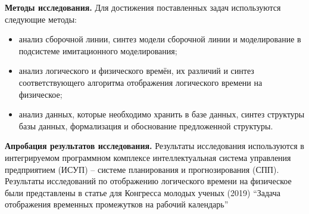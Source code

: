 \indent \textbf{Методы исследования.}
Для достижения поставленных задач используются следующие методы:
\begin{itemize}
	\item анализ сборочной линии, синтез модели сборочной линии и моделирование в подсистеме имитационного моделирования;
	\item анализ логического и физического времён, их различий и синтез соответствующего алгоритма отображения логического времени на физическое;
	\item анализ данных, которые необходимо хранить в базе данных, синтез структуры базы данных, формализация и обоснование предложенной структуры.
\end{itemize}
\indent \textbf{Апробация результатов исследования.}
Результаты исследования используются в интегрируемом программном комплексе интеллектуальная система управления предприятием (ИСУП) – системе планирования и прогнозирования (СПП). 
Результаты исследований по отображению логического времени на физическое были представлены в статье для Конгресса молодых ученых (2019) ``Задача отображения временных промежутков на рабочий календарь''